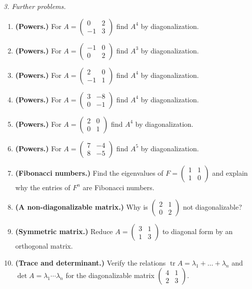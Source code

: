 \emph{3. Further problems.}
\bigskip
\begin{enumerate}[label=\arabic*., leftmargin=*]
\item \textbf{(Powers.)} For $A=\begin{pmatrix}0 & 2\\ -1 & 3\end{pmatrix}$ find $A^{4}$ by diagonalization.
\item \textbf{(Powers.)} For $A=\begin{pmatrix}-1 & 0\\ 0 & 2\end{pmatrix}$ find $A^{3}$ by diagonalization.
\item \textbf{(Powers.)} For $A=\begin{pmatrix}2 & 0\\ -1 & 1\end{pmatrix}$ find $A^{4}$ by diagonalization.
\item \textbf{(Powers.)} For $A=\begin{pmatrix}3 & -8\\ 0 & -1\end{pmatrix}$ find $A^{4}$ by diagonalization.
\item \textbf{(Powers.)} For $A=\begin{pmatrix}2 & 0\\ 0 & 1\end{pmatrix}$ find $A^{4}$ by diagonalization.
\item \textbf{(Powers.)} For $A=\begin{pmatrix}7 & -4\\ 8 & -5\end{pmatrix}$ find $A^{5}$ by diagonalization.
\item \textbf{(Fibonacci numbers.)} Find the eigenvalues of $F=\left(\begin{smallmatrix}1&1\\1&0\end{smallmatrix}\right)$ and explain why the entries of $F^n$ are Fibonacci numbers.
\item \textbf{(A non-diagonalizable matrix.)} Why is $\left(\begin{smallmatrix}2&1\\0&2\end{smallmatrix}\right)$ not diagonalizable?
\item \textbf{(Symmetric matrix.)} Reduce $A=\left(\begin{smallmatrix}3&1\\1&3\end{smallmatrix}\right)$ to diagonal form by an orthogonal matrix.
\item \textbf{(Trace and determinant.)} Verify the relations $\operatorname{tr}A=\lambda_1+\dots+\lambda_n$ and $\det A=\lambda_1\cdots\lambda_n$ for the diagonalizable matrix $\left(\begin{smallmatrix}4&1\\2&3\end{smallmatrix}\right)$.
\end{enumerate}

